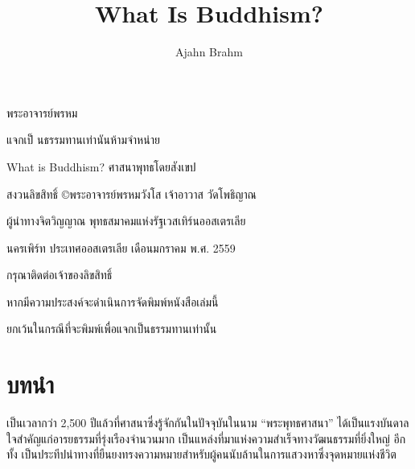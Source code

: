 \documentclass[12pt, openany]{book}
\title{What Is Buddhism?}
\author{Ajahn Brahm}
\date{}
\begin{document}
\raggedbottom

\frontmatter

\begin{center}\end{center}
\begin{center}

\vspace{9em}


\vspace{9em}

{\Large พระอาจารย์พรหม}


\end{center}

\newpage

{\small

\noindent แจกเป็ นธรรมทานเท่านันห้ามจำหน่าย

\bigskip

\noindent What is Buddhism?
\noindent ศาสนาพุทธโดยสังเขป

\bigskip

\noindent สงวน{\wbr}ลิขสิทธิ์ ©พระ{\wbr}อาจารย์{\wbr}พรหม{\wbr}วัง{\wbr}โส เจ้าอาวาส วัด{\wbr}โพธิญาณ

\noindent ผู้นำ{\wbr}ทาง{\wbr}จิต{\wbr}วิญญาณ พุทธ{\wbr}สมาคม{\wbr}แห่ง{\wbr}รัฐ{\wbr}เวสเทิร์น{\wbr}ออสเตรเลีย

\bigskip

\noindent นคร{\wbr}เพิร์ท ประเทศ{\wbr}ออสเตรเลีย เดือน{\wbr}มกราคม พ.{\wbr}ศ. 2559

\bigskip

\noindent กรุณา{\wbr}ติดต่อ{\wbr}เจ้าของ{\wbr}ลิขสิทธิ์ 

\noindent หาก{\wbr}มี{\wbr}ความ{\wbr}ประสงค์{\wbr}จะ{\wbr}ดำเนิน{\wbr}การ{\wbr}จัด{\wbr}พิมพ์{\wbr}หนังสือ{\wbr}เล่ม{\wbr}นี้ 

\noindent ยกเว้น{\wbr}ใน{\wbr}กรณี{\wbr}ที่{\wbr}จะ{\wbr}พิมพ์{\wbr}เพื่อ{\wbr}แจก{\wbr}เป็น{\wbr}ธรรม{\wbr}ทาน{\wbr}เท่านั้น

}



\newpage


\tableofcontents


\chapter*{บทนำ}

เป็น{\wbr}เวลา{\wbr}กว่า 2,500 ปี{\wbr}แล้ว{\wbr}ที่{\wbr}ศาสนา{\wbr}ซึ่ง{\wbr}รู้จัก{\wbr}กัน{\wbr}ใน{\wbr}ปัจจุบัน{\wbr}ใน{\wbr}นาม “พระ{\wbr}พุทธ{\wbr}ศาสนา” ได้{\wbr}เป็น{\wbr}แรง{\wbr}บันดาล{\wbr}ใจ{\wbr}สำคัญ{\wbr}แก่{\wbr}อารยธรรม{\wbr}ที่{\wbr}รุ่งเรือง{\wbr}จำนวน{\wbr}มาก เป็น{\wbr}แหล่ง{\wbr}ที่{\wbr}มา{\wbr}แห่ง{\wbr}ความ{\wbr}สําเร็จ{\wbr}ทาง{\wbr}วัฒนธรรม{\wbr}ที่{\wbr}ยิ่งใหญ่ อีก{\wbr}ทั้ง เป็น{\wbr}ประทีป{\wbr}นำทาง{\wbr}ที่{\wbr}ยืนยง{\wbr}ทรง{\wbr}ความหมาย{\wbr}สํา{\wbr}หรับ{\wbr}ผู้คน{\wbr}นับ{\wbr}ล้าน{\wbr}ใน{\wbr}การ{\wbr}แสวง{\wbr}หา{\wbr}ซึ่ง{\wbr}จุด{\wbr}หมาย{\wbr}แห่ง{\wbr}ชีวิต  
\end{document}
